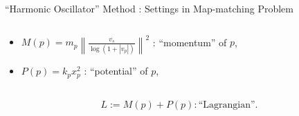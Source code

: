 \documentclass[aspectratio=169, bigfiles]{beamer}
\newcommand{\R}{\mathbb{R}}
\begin{document}
\begin{frame}{``Harmonic Oscillator'' Method : Settings in Map-matching Problem}
\begin{columns}[t]
\begin{column}{0.7\textwidth}
\begin{itemize}
        \item
        $M(p) = m_{p}\left\|\frac{v_{s}}{\log(1+|v_{p}|)}\right\|^{2}$ : ``momentum'' of $p$,
        \item
        $P(p) = k_{p}x_{p}^{2}$ : ``potential'' of $p$,
    \end{itemize}
\end{column}
\end{columns}
\begin{tcolorbox}[colframe=yellow,
colback=yellow!10!white,
colbacktitle=yellow!40!white,
coltitle=black, fonttitle=\bfseries]
\vspace{-4mm}
    \begin{align*}
        L := M(p) + P(p) : \text{``Lagrangian''}.
    \end{align*}
\end{tcolorbox}
\end{frame}
\end{document}
